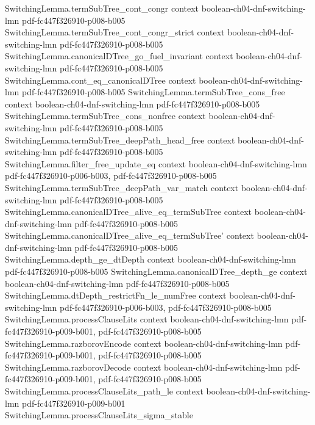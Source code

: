\begin{theorem}
\proofstep
  {SwitchingLemma.termSubTree_cont_congr}
  {context}
  {boolean-ch04-dnf-switching-lmn}
  {pdf-fc447f326910-p008-b005}
\proofstep
  {SwitchingLemma.termSubTree_cont_congr_strict}
  {context}
  {boolean-ch04-dnf-switching-lmn}
  {pdf-fc447f326910-p008-b005}
\proofstep
  {SwitchingLemma.canonicalDTree_go_fuel_invariant}
  {context}
  {boolean-ch04-dnf-switching-lmn}
  {pdf-fc447f326910-p008-b005}
\proofstep
  {SwitchingLemma.cont_eq_canonicalDTree}
  {context}
  {boolean-ch04-dnf-switching-lmn}
  {pdf-fc447f326910-p008-b005}
\proofstep
  {SwitchingLemma.termSubTree_cons_free}
  {context}
  {boolean-ch04-dnf-switching-lmn}
  {pdf-fc447f326910-p008-b005}
\proofstep
  {SwitchingLemma.termSubTree_cons_nonfree}
  {context}
  {boolean-ch04-dnf-switching-lmn}
  {pdf-fc447f326910-p008-b005}
\proofstep
  {SwitchingLemma.termSubTree_deepPath_head_free}
  {context}
  {boolean-ch04-dnf-switching-lmn}
  {pdf-fc447f326910-p008-b005}
\proofstep
  {SwitchingLemma.filter_free_update_eq}
  {context}
  {boolean-ch04-dnf-switching-lmn}
  {pdf-fc447f326910-p006-b003,
    pdf-fc447f326910-p008-b005}
\proofstep
  {SwitchingLemma.termSubTree_deepPath_var_match}
  {context}
  {boolean-ch04-dnf-switching-lmn}
  {pdf-fc447f326910-p008-b005}
\proofstep
  {SwitchingLemma.canonicalDTree_alive_eq_termSubTree}
  {context}
  {boolean-ch04-dnf-switching-lmn}
  {pdf-fc447f326910-p008-b005}
\proofstep
  {SwitchingLemma.canonicalDTree_alive_eq_termSubTree'}
  {context}
  {boolean-ch04-dnf-switching-lmn}
  {pdf-fc447f326910-p008-b005}
\proofstep
  {SwitchingLemma.depth_ge_dtDepth}
  {context}
  {boolean-ch04-dnf-switching-lmn}
  {pdf-fc447f326910-p008-b005}
\proofstep
  {SwitchingLemma.canonicalDTree_depth_ge}
  {context}
  {boolean-ch04-dnf-switching-lmn}
  {pdf-fc447f326910-p008-b005}
\proofstep
  {SwitchingLemma.dtDepth_restrictFn_le_numFree}
  {context}
  {boolean-ch04-dnf-switching-lmn}
  {pdf-fc447f326910-p006-b003,
    pdf-fc447f326910-p008-b005}
\proofstep
  {SwitchingLemma.processClauseLits}
  {context}
  {boolean-ch04-dnf-switching-lmn}
  {pdf-fc447f326910-p009-b001,
    pdf-fc447f326910-p008-b005}
\proofstep
  {SwitchingLemma.razborovEncode}
  {context}
  {boolean-ch04-dnf-switching-lmn}
  {pdf-fc447f326910-p009-b001,
    pdf-fc447f326910-p008-b005}
\proofstep
  {SwitchingLemma.razborovDecode}
  {context}
  {boolean-ch04-dnf-switching-lmn}
  {pdf-fc447f326910-p009-b001,
    pdf-fc447f326910-p008-b005}
\proofstep
  {SwitchingLemma.processClauseLits_path_le}
  {context}
  {boolean-ch04-dnf-switching-lmn}
  {pdf-fc447f326910-p009-b001}
\proofstep
  {SwitchingLemma.processClauseLits_sigma_stable}

\end{theorem}
